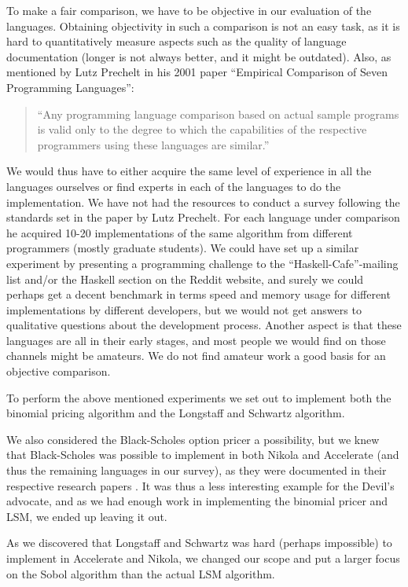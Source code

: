 To make a fair comparison, we have to be objective in our evaluation
of the languages. Obtaining objectivity in such a comparison is not
an easy task, as it is hard to quantitatively measure aspects such as
the quality of language documentation (longer is not always better,
and it might be outdated). Also, as mentioned by Lutz Prechelt in his
2001 paper ``Empirical Comparison of Seven Programming Languages'':
\begin{quote}
  ``Any programming language comparison based on actual sample programs
  is valid only to the degree to which the capabilities of the
  respective programmers using these languages are similar.''
\end{quote}
We would thus have to either acquire the same level of experience in all the
languages ourselves or find experts in each of the languages to do the
implementation. We have not had the resources to conduct a survey
following the standards set in the paper by Lutz Prechelt. For each
language under comparison he acquired 10-20 implementations of the
same algorithm from different programmers (mostly graduate
students). We could have set up a similar experiment by presenting a
programming challenge to the ``Haskell-Cafe''-mailing list and/or the
Haskell section on the Reddit website, and surely we could perhaps get
a decent benchmark in terms speed and memory usage for different
implementations by different developers, but we would not get answers
to qualitative questions about the development process. Another aspect
is that these languages are all in their early stages, and most people
we would find on those channels might be amateurs. We do not find
amateur work a good basis for an objective comparison.

To perform the above mentioned experiments we set out to implement
both the binomial pricing algorithm and the Longstaff and Schwartz
algorithm. 

We also considered the Black-Scholes option pricer a possibility, but
we knew that Black-Scholes was possible to implement in both Nikola
and Accelerate (and thus the remaining languages in our survey), as
they were documented in their respective research papers
\cite{mainland2010nikola, chakravarty2011accelerating}. It was thus a
less interesting example for the Devil's advocate, and as we had
enough work in implementing the binomial pricer and LSM, we ended up
leaving it out.

As we discovered that Longstaff and Schwartz was hard (perhaps
impossible) to implement in Accelerate and Nikola, we changed our
scope and put a larger focus on the Sobol algorithm than the actual
LSM algorithm.

